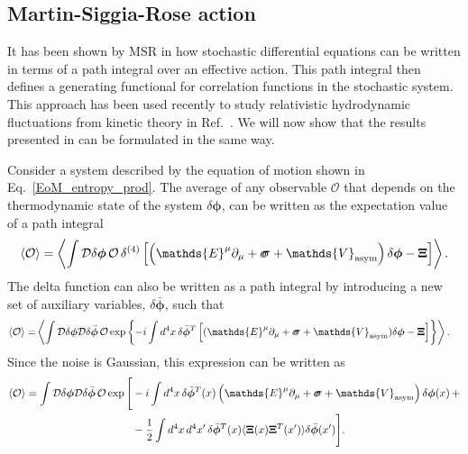 \documentclass[aps,prd,nofootinbib,amsmath,amssymb,showpacs,longbibliography,singlecolumn,superscriptaddress,notitlepage]{revtex4-1}
\theoremstyle{plain}
\theoremstyle{definition}
\newcommand*{\Scale}[2][4]{\scalebox{#1}{$#2$}}%
\newcommand{\forceds}[1]{\Scale[1.1]{\ensuremath{\mathrlap{{{#1}}}\hspace{1.4pt}#1}}}
\newcommand{\cvec}[1]{\ensuremath{\bm {#1}}}
\newcommand{\cmat}[1]{\ensuremath{\mathds{{#1}}}}
\newcommand{\cmatgreek}[1]{\ensuremath{\forceds{{#1}}}}
\begin{document}
\subsection{Martin-Siggia-Rose action}
\label{Sec:MSR_action}

It has been shown by MSR in \cite{Martin:1973zz} how stochastic differential equations can be written in terms of a path integral over an effective action. This path integral then defines a generating functional for correlation functions in the stochastic system. This approach has been used recently to study relativistic hydrodynamic fluctuations from kinetic theory in Ref.\  \cite{Granese:2022igc}. We will now show that the results presented in \cite{Mullins:2023tjg} can be formulated in the same way. 

Consider a system described by the equation of motion shown in Eq.\ \eqref{EoM_entropy_prod}. The average of any observable $\mathcal{O}$ that depends on the thermodynamic state of the system $\delta \cvec{\phi}$, can be written as the expectation value of a path integral 
\begin{equation}
    \langle \mathcal{O} \rangle = \left\langle \int \mathcal{D} \delta \cvec{\phi} \, \mathcal{O} \, \delta^{(4)} \left[ \left( \cmat{E}^{\mu} \partial_{\mu} + \cmatgreek{\sigma} + \cmat{V}_{\mathrm{asym}} \right) \delta \cvec{\phi} - \cvec{\Xi} \right] \right\rangle .
\end{equation}
The delta function can also be written as a path integral by introducing a new set of auxiliary variables, $\delta \bar{\cvec{\phi}}$, such that
\begin{equation}
\begin{split}
    \left\langle \mathcal{O} \right\rangle = & \left\langle \int \mathcal{D} \delta \cvec{\phi} \mathcal{D} \delta \bar{\cvec{\phi}} \, \mathcal{O} \exp \left\{ -i \int d^4x \, \delta \bar{\cvec{\phi}}^T \left[ (\cmat{E}^{\mu} \partial_{\mu} + \cmatgreek{\sigma} + \cmat{V}_{\mathrm{asym}}) \delta \cvec{\phi} - \cvec{\Xi} \right] \right\} \right\rangle .
\end{split}
\end{equation}
Since the noise is Gaussian, this expression can be written as
\begin{equation}
\begin{split}
    \left\langle \mathcal{O} \right\rangle = \int \mathcal{D} \delta \cvec{\phi} \mathcal{D} \delta \bar{\cvec{\phi}} \, \mathcal{O} \exp \Bigg[ & -i \int d^4x \, \delta \bar{\cvec{\phi}}^T(x) \left( \cmat{E}^{\mu} \partial_{\mu} + \cmatgreek{\sigma} + \cmat{V}_{\mathrm{asym}} \right) \delta \cvec{\phi}(x) \, + \\
    & - \frac{1}{2} \int d^4x \, d^4x' \, \delta \bar{\cvec{\phi}}^T(x) \langle \cvec{\Xi}(x) \cvec{\Xi}^T(x') \rangle \delta \bar{\cvec{\phi}}(x') \Bigg] .
\end{split}
\end{equation}
\end{document}
